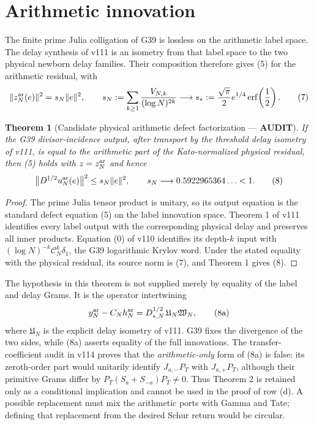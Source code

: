 \documentclass[11pt]{article}
\newcommand{\AUDIT}{\textcolor{orange!70!black}{\textbf{AUDIT}}}
\newtheorem{theorem}{Theorem}
\begin{document}
\section{Arithmetic innovation}

The finite prime Julia colligation of G39 is lossless on the arithmetic
label space.  The delay synthesis of v111 is an isometry from that label
space to the two physical newborn delay families.  Their composition
therefore gives (5) for the arithmetic residual, with
\begin{equation}
 \|z_N^{\rm ar}(e)\|^2
 =s_N\|e\|^2,
 \qquad
 s_N:=\sum_{k\ge1}\frac{V_{N,k}}{(\log N)^{2k}}
 \longrightarrow s_*:=
 \frac{\sqrt\pi}{2}e^{1/4}\operatorname{erf}\!\left(\frac12\right).
                                                                    \tag{7}
\end{equation}

\begin{theorem}[Candidate physical arithmetic defect factorization --- \AUDIT]
If the G39 divisor-incidence output, after transport by the threshold delay
isometry of v111, is equal to the arithmetic part of the Kato-normalized
physical residual, then (5) holds with $z=z_N^{\rm ar}$ and hence
\begin{equation}
 \bigl\|D^{\dagger/2}u_N^{\rm ar}(e)\bigr\|^2
 \le s_N\|e\|^2,
 \qquad s_N\longrightarrow0.5922965364\ldots<1.               \tag{8}
\end{equation}
\end{theorem}

\begin{proof}
The prime Julia tensor product is unitary, so its output equation is the
standard defect equation (5) on the label innovation space.  Theorem 1 of
v111 identifies every label output with the corresponding physical delay
and preserves all inner products.  Equation (0) of v110 identifies its
depth-$k$ input with $(\log N)^{-k}\mathcal C_N^k\delta_1$, the G39
logarithmic Krylov word.  Under the stated equality with the physical
residual, its source norm is (7), and Theorem 1 gives (8).
\end{proof}

The hypothesis in this theorem is not supplied merely by equality of the
label and delay Grams.  It is the operator intertwining
\begin{equation}
 y_N^{\rm ar}-C_Nh_N^{\rm ar}
 =D_{*,N}^{1/2}\,
   \mathfrak U_N\mathfrak W_N,                                \tag{8a}
\end{equation}
where $\mathfrak U_N$ is the explicit delay isometry of v111.  G39 fixes
the divergence of the two sides, while (8a) asserts equality of the full
innovations.  The transfer-coefficient audit in v114 proves that the
\emph{arithmetic-only} form of (8a) is false: its zeroth-order part would
unitarily identify $J_{a,-}P_T$ with $J_{a,+}P_T$, although their primitive
Grams differ by $P_T(S_a+S_{-a})P_T\ne0$.  Thus Theorem 2 is retained only
as a conditional implication and cannot be used in the proof of row (d).
A possible replacement must mix the arithmetic ports with Gamma and Tate;
defining that replacement from the desired Schur return would be circular.
\end{document}
